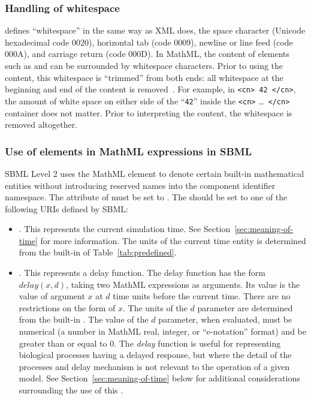 \subsubsection{Handling of whitespace}
\label{sec:mathml-whitespace}

\mathmltwo defines ``whitespace'' in the same way as XML does, \ie
the space character (Unicode hexadecimal code 0020), horizontal
tab (code 0009), newline or line feed (code 000A), and carriage
return (code 000D).  In MathML, the content of elements such as
 and  can be surrounded by whitespace
characters.  Prior to using the content, this whitespace is
``trimmed'' from both ends: all whitespace at the beginning and
end of the content is removed~\citep{ausbrooks:2003}.  For
example, in \texttt{<cn> 42 </cn>}, the amount of white space on
either side of the ``\texttt{42}'' inside the \texttt{<cn>}
\ldots\ \texttt{</cn>} container does not matter.  Prior to
interpreting the content, the whitespace is removed altogether.


\subsubsection{Use of  elements in MathML expressions in SBML}
\label{sec:csymbol-token}

SBML Level 2 uses the MathML  element to denote
certain built-in mathematical entities without introducing
reserved names into the component identifier namespace.  The
 attribute of  must be set to
.  The  should be set to one of the
following URIs defined by SBML:
\begin{itemize}

\item {}.  This
  represents the current simulation time.  See
  Section~\ref{sec:meaning-of-time} for more information.  The
  units of the current time entity is determined from the
  built-in  of Table~\vref{tab:predefined}.

\item {}.  This
 represents a delay function.  The delay function has the form
  $delay(x, d)$, taking two MathML expressions as arguments.  Its
  value is the value of argument $x$ at $d$ time units before the
  current time.  There are no restrictions on the form of $x$.
  The units of the $d$ parameter are determined from the built-in
  .  The value of the $d$ parameter, when evaluated,
  must be numerical (\ie a number in MathML real, integer, or
  ``e-notation'' format) and be greater than or equal to 0.  The
  \emph{delay} function is useful for representing biological
  processes having a delayed response, but where the detail of the
  processes and delay mechanism is not relevant to the operation
  of a given model.  See Section~\ref{sec:meaning-of-time} below
  for additional considerations surrounding the use of this
  .

\end{itemize}

